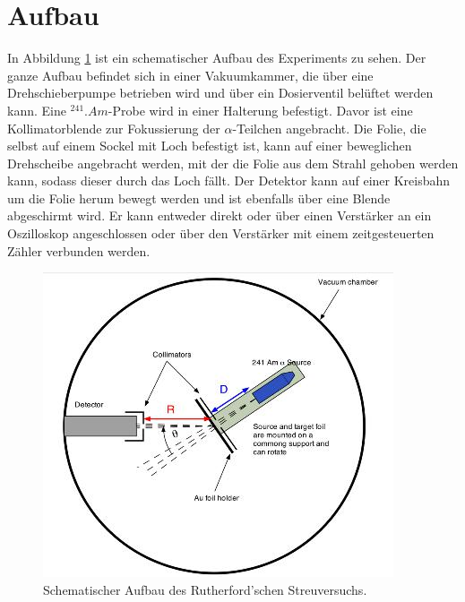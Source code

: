 \section{Aufbau}
\label{sec:Aufbau}

In Abbildung \ref{fig:Aufbau} ist ein schematischer Aufbau des Experiments zu sehen.
Der ganze Aufbau befindet sich in einer Vakuumkammer, die über eine Drehschieberpumpe betrieben wird und über ein Dosierventil belüftet werden kann.
Eine $^{241}.{Am}$-Probe wird in einer Halterung befestigt. Davor ist eine Kollimatorblende zur Fokussierung der $\alpha$-Teilchen angebracht.
Die Folie, die selbst auf einem Sockel mit Loch befestigt ist, kann auf einer beweglichen Drehscheibe angebracht werden, mit der die Folie aus dem Strahl gehoben werden kann, sodass dieser durch das Loch fällt.
Der Detektor kann auf einer Kreisbahn um die Folie herum bewegt werden und ist ebenfalls über eine Blende abgeschirmt wird.
Er kann entweder direkt oder über einen Verstärker an ein Oszilloskop angeschlossen oder über den Verstärker mit einem zeitgesteuerten Zähler verbunden werden.

\begin{figure}
\centering
\includegraphics[width=\linewidth-70pt,height=\textheight-70pt,keepaspectratio]{content/images/Aufbau.jpg}
\caption{Schematischer Aufbau des Rutherford'schen Streuversuchs.\cite{Aufbau16}}
\label{fig:Aufbau}
\end{figure}
